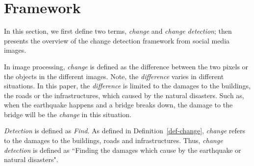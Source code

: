 \documentclass[runningheads,a4paper]{llncs}
\newcommand{\naoki}{\todo[author=NK,color=yellow,inline]}
\begin{document}


 \naoki{Edit End}



\section{Framework}\label{sec-framework}

In this section,
we first define two terms, \emph{change} and \emph{change detection}; 
then presents the overview of the change detection framework from social media images. 

\begin{definition}\label{def-change}
In image processing, \emph{change} is defined as the difference between the two pixels or the objects in the different images. 
Note, the \emph{difference} varies in different situations. 
In this paper, the \emph{difference} is limited to the damages to the buildings, the roads or the infrastructures, which caused by the natural disasters. Such as, when the earthquake happens and a bridge breaks down, the damage to the bridge will be the \emph{change} in this situation.  
\end{definition}

\begin{definition}
\emph{Detection} is defined as \emph{Find}.
As defined in Definition~\ref{def-change}, \emph{change} refers to the damages to the buildings, roads and infrastructures.
Thus, \emph{change detection} is defined as ``Finding the damages which cause by the earthquake or natural disasters".
\end{definition}
\end{document}
